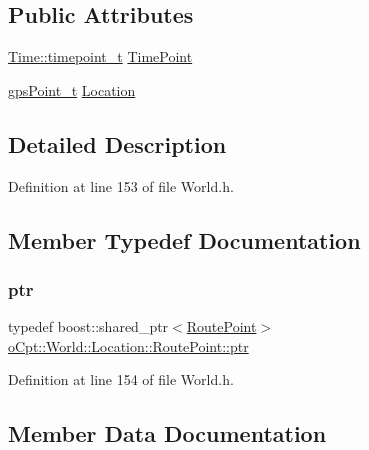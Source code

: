 \subsection*{Public Attributes}
\begin{DoxyCompactItemize}
\item 
\hyperlink{classo_cpt_1_1_world_1_1_time_a6a6e782c3c90622c1c7070b0a223ec4c}{Time\+::timepoint\+\_\+t} \hyperlink{structo_cpt_1_1_world_1_1_location_1_1_route_point_ab1843ea5bc2555a1258f15578198fb3d}{Time\+Point}
\item 
\hyperlink{classo_cpt_1_1_world_1_1_location_a3aa5e31e2888b4da40ad534b99473888}{gps\+Point\+\_\+t} \hyperlink{structo_cpt_1_1_world_1_1_location_1_1_route_point_af28b02113dd9042cc49e661d29330fe5}{Location}
\end{DoxyCompactItemize}


\subsection{Detailed Description}


Definition at line 153 of file World.\+h.



\subsection{Member Typedef Documentation}
\hypertarget{structo_cpt_1_1_world_1_1_location_1_1_route_point_aa042feea77cb3c1531ab4e8ecf42fbd6}{}\label{structo_cpt_1_1_world_1_1_location_1_1_route_point_aa042feea77cb3c1531ab4e8ecf42fbd6} 
\subsubsection{\texorpdfstring{ptr}{ptr}}
{\footnotesize\ttfamily typedef boost\+::shared\+\_\+ptr$<$\hyperlink{structo_cpt_1_1_world_1_1_location_1_1_route_point}{Route\+Point}$>$ \hyperlink{structo_cpt_1_1_world_1_1_location_1_1_route_point_aa042feea77cb3c1531ab4e8ecf42fbd6}{o\+Cpt\+::\+World\+::\+Location\+::\+Route\+Point\+::ptr}}



Definition at line 154 of file World.\+h.



\subsection{Member Data Documentation}
\hypertarget{structo_cpt_1_1_world_1_1_location_1_1_route_point_af28b02113dd9042cc49e661d29330fe5}{}\label{structo_cpt_1_1_world_1_1_location_1_1_route_point_af28b02113dd9042cc49e661d29330fe5} 
